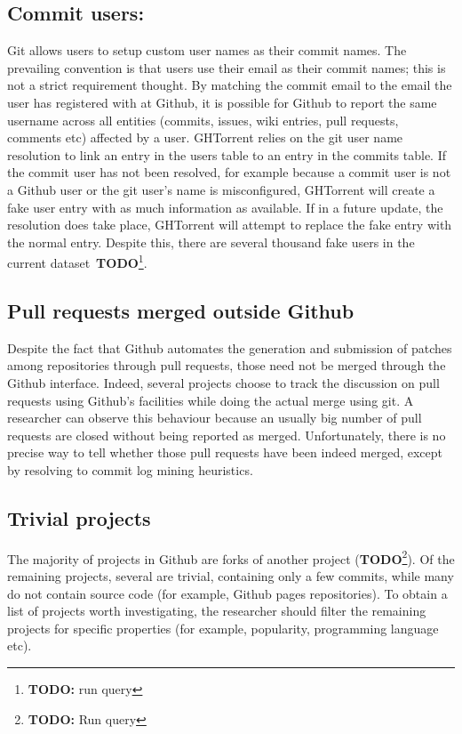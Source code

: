 \documentclass[conference]{IEEEtran}
\newcommand{\todo}[1]{\textbf{TODO}\footnote{\textbf{TODO:} #1}}
\begin{document}
\subsection{Commit users:} Git allows users to setup custom user names as
    their commit names. The prevailing convention is that users use their email
    as their commit names; this is not a strict requirement thought. By matching
    the commit email to the email the user has registered with at Github, it is
    possible for Github to report the same username across all entities
    (commits, issues, wiki entries, pull requests, comments etc) affected by a
    user. GHTorrent relies on the git user name resolution to link an entry in
    the \textsf{users} table to an entry in the \textsf{commits} table. If the
    commit user has not been resolved, for example because a commit user is not
    a Github user or the git user's name is misconfigured, GHTorrent will create
    a fake user entry with as much information as available. If in a future
    update, the resolution does take place, GHTorrent will attempt to replace
    the fake entry with the normal entry. Despite this, there are several
    thousand fake users in the current dataset~\todo{run query}.
    
\subsection{Pull requests merged outside Github} Despite the fact that Github
    automates the generation and submission of patches among repositories
    through pull requests, those need not be merged through the Github
    interface. Indeed, several projects choose to track the discussion on pull
    requests using Github's facilities while doing the actual merge using
    {\sf git}. A researcher can observe this behaviour because an usually big
    number of pull requests are closed without being reported as merged.
    Unfortunately, there is no precise way to tell whether those pull requests
    have been indeed merged, except by resolving to commit log mining
    heuristics.

\subsection{Trivial projects} The majority of projects in Github are forks of
    another project (\todo{Run query}). Of the remaining projects, several are
    trivial, containing only a few commits, while many do not contain source
    code (for example, Github pages repositories). To obtain a list of projects
    worth investigating, the researcher should filter the remaining projects
    for specific properties (for example, popularity, programming language etc).
\end{document}
